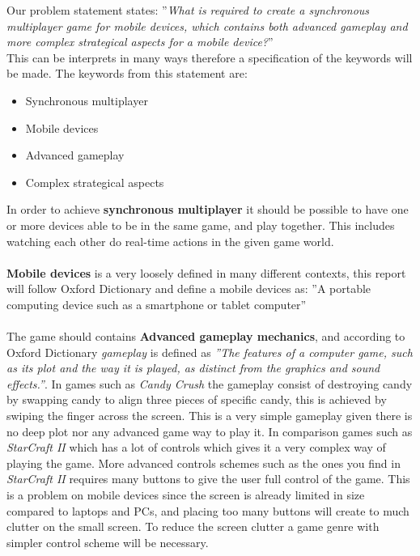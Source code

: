 Our problem statement states: ''\textit{What is required to create a synchronous multiplayer game for mobile devices, which contains both advanced
gameplay and more complex strategical aspects for a mobile device?}''\\
This can be interprets in many ways therefore a specification of the keywords will be made.
The keywords from this statement are:
\begin{itemize}
\item Synchronous multiplayer
\item Mobile devices
\item Advanced gameplay
\item Complex strategical aspects
\end{itemize}
In order to achieve \textbf{synchronous multiplayer} it should be possible to have one or more devices able to be in the same game, and play together. This includes watching each other do real-time actions in the given game world.\\\\
\textbf{Mobile devices} is a very loosely defined in many different contexts, this report will follow Oxford Dictionary and define a mobile devices as: ''A portable computing device such as a smartphone or tablet computer''\\\\
The game should contains \textbf{Advanced gameplay mechanics}, and according to Oxford Dictionary \textit{gameplay} is defined as \textit{''The features of a computer game, such as its plot and the way it is played, as distinct from the graphics and sound effects.''}.
In games such as \textit{Candy Crush}  the gameplay consist of destroying candy by swapping candy to align three pieces of specific candy, this is achieved by swiping the finger across the screen.
This is a very simple gameplay given there is no deep plot nor any advanced game way to play it. In comparison games such as \textit{StarCraft II}  which has a lot of controls which gives it a very complex way of playing the game.
More advanced controls schemes such as the ones you find in \textit{StarCraft II} requires many buttons to give the user full control of the game.
This is a problem on mobile devices since the screen is already limited in size compared to laptops and PCs, and placing too many buttons will create to much clutter on the small screen.
To reduce the screen clutter a game genre with simpler control scheme will be necessary.\\
